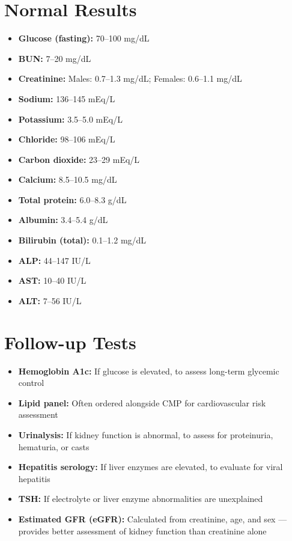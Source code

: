 \section*{Normal Results}
\begin{itemize}
  \item \textbf{Glucose (fasting):} 70--100 mg/dL
  \item \textbf{BUN:} 7--20 mg/dL
  \item \textbf{Creatinine:} Males: 0.7--1.3 mg/dL; Females: 0.6--1.1 mg/dL
  \item \textbf{Sodium:} 136--145 mEq/L
  \item \textbf{Potassium:} 3.5--5.0 mEq/L
  \item \textbf{Chloride:} 98--106 mEq/L
  \item \textbf{Carbon dioxide:} 23--29 mEq/L
  \item \textbf{Calcium:} 8.5--10.5 mg/dL
  \item \textbf{Total protein:} 6.0--8.3 g/dL
  \item \textbf{Albumin:} 3.4--5.4 g/dL
  \item \textbf{Bilirubin (total):} 0.1--1.2 mg/dL
  \item \textbf{ALP:} 44--147 IU/L
  \item \textbf{AST:} 10--40 IU/L
  \item \textbf{ALT:} 7--56 IU/L
\end{itemize}

\section*{Follow-up Tests}
\begin{itemize}
  \item \textbf{Hemoglobin A1c:} If glucose is elevated, to assess long-term glycemic control
  \item \textbf{Lipid panel:} Often ordered alongside CMP for cardiovascular risk assessment
  \item \textbf{Urinalysis:} If kidney function is abnormal, to assess for proteinuria, hematuria, or casts
  \item \textbf{Hepatitis serology:} If liver enzymes are elevated, to evaluate for viral hepatitis
  \item \textbf{TSH:} If electrolyte or liver enzyme abnormalities are unexplained
  \item \textbf{Estimated GFR (eGFR):} Calculated from creatinine, age, and sex --- provides better assessment of kidney function than creatinine alone
\end{itemize}


